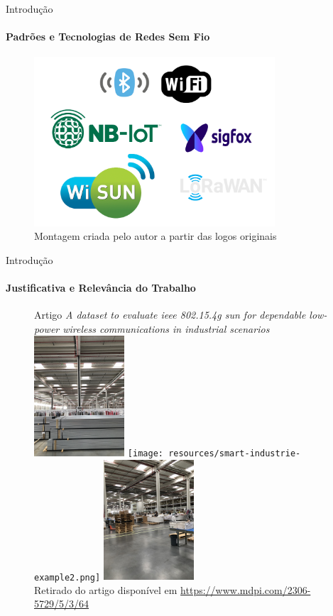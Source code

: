 \documentclass[c]{beamer}
\begin{document}
\begin{darkframes}
  \begin{frame}{Introdução}
    \framesubtitle{Padrões e Tecnologias de Redes Sem Fio}
    \begin{figure}[ht]
      \centering
      \includegraphics[width=0.8\textwidth]{resources/tecnologias-sem-fio.png}\\
      \footnotesize{Montagem criada pelo autor a partir das logos originais}
    \end{figure}
  \end{frame}

  \begin{frame}{Introdução}
    \framesubtitle{Justificativa e Relevância do Trabalho}
    \begin{figure}[ht]
      \centering
      Artigo \emph{A dataset to evaluate ieee 802.15.4g sun for dependable low-power wireless communications in industrial scenarios}
      \includegraphics[width=0.3\textwidth]{resources/smart-industrie-example.png}
      \texttt{[image: resources/smart-industrie-example2.png]}
      \includegraphics[width=0.3\textwidth]{resources/smart-industrie-example3.png}\\
      \footnotesize{Retirado do artigo disponível em \url{https://www.mdpi.com/2306-5729/5/3/64}}
    \end{figure}
  \end{frame}


\end{darkframes}
\end{document}
